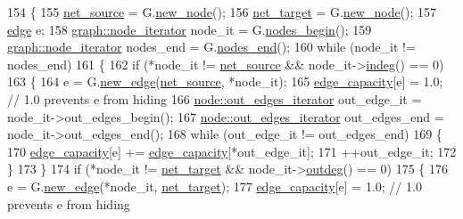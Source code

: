 \begin{DoxyCode}
154 \{
155     \mbox{\hyperlink{classmaxflow__pp_a20f2d05465acc2d7b777ea8025d12003}{net\_source}} = G.\mbox{\hyperlink{classgraph_ab9505335c20558319b6cce25aed23524}{new\_node}}();
156     \mbox{\hyperlink{classmaxflow__pp_a10f0b047011e04cb4816a824da5b7892}{net\_target}} = G.\mbox{\hyperlink{classgraph_ab9505335c20558319b6cce25aed23524}{new\_node}}();
157     \mbox{\hyperlink{classedge}{edge}} e;
158     \mbox{\hyperlink{classgraph_a2cb374b84c133ce13f94e73c3e5da7fa}{graph::node\_iterator}} node\_it = G.\mbox{\hyperlink{classgraph_aec053a4b509d1be804237a80044c54c0}{nodes\_begin}}();
159     \mbox{\hyperlink{classgraph_a2cb374b84c133ce13f94e73c3e5da7fa}{graph::node\_iterator}} nodes\_end = G.\mbox{\hyperlink{classgraph_abbf9c0cb5629e98e1142254911238173}{nodes\_end}}();
160     \textcolor{keywordflow}{while} (node\_it != nodes\_end)
161     \{
162     \textcolor{keywordflow}{if} (*node\_it != \mbox{\hyperlink{classmaxflow__pp_a20f2d05465acc2d7b777ea8025d12003}{net\_source}} && node\_it->\mbox{\hyperlink{classnode_a749bfd1316584b96f8c9b0e44ad512f0}{indeg}}() == 0)
163     \{
164         e = G.\mbox{\hyperlink{classgraph_a02a0c3a219f75d68caa408ef339d4a1c}{new\_edge}}(\mbox{\hyperlink{classmaxflow__pp_a20f2d05465acc2d7b777ea8025d12003}{net\_source}}, *node\_it);
165         \mbox{\hyperlink{classmaxflow__pp_af3cdc4999a86322271a80b1855d58629}{edge\_capacity}}[e] = 1.0;    \textcolor{comment}{// 1.0 prevents e from hiding}
166         \mbox{\hyperlink{classnode_a90e17ed34de55072e8077f4367499a98}{node::out\_edges\_iterator}} out\_edge\_it = node\_it->out\_edges\_begin();
167         \mbox{\hyperlink{classnode_a90e17ed34de55072e8077f4367499a98}{node::out\_edges\_iterator}} out\_edges\_end = node\_it->out\_edges\_end();
168         \textcolor{keywordflow}{while} (out\_edge\_it != out\_edges\_end)
169         \{
170         \mbox{\hyperlink{classmaxflow__pp_af3cdc4999a86322271a80b1855d58629}{edge\_capacity}}[e] += \mbox{\hyperlink{classmaxflow__pp_af3cdc4999a86322271a80b1855d58629}{edge\_capacity}}[*out\_edge\_it];
171         ++out\_edge\_it;
172         \}
173     \}
174     \textcolor{keywordflow}{if} (*node\_it != \mbox{\hyperlink{classmaxflow__pp_a10f0b047011e04cb4816a824da5b7892}{net\_target}} && node\_it->\mbox{\hyperlink{classnode_a32adc45c4132e2642ccd2233d79ffe67}{outdeg}}() == 0)
175     \{
176         e = G.\mbox{\hyperlink{classgraph_a02a0c3a219f75d68caa408ef339d4a1c}{new\_edge}}(*node\_it, \mbox{\hyperlink{classmaxflow__pp_a10f0b047011e04cb4816a824da5b7892}{net\_target}});
177         \mbox{\hyperlink{classmaxflow__pp_af3cdc4999a86322271a80b1855d58629}{edge\_capacity}}[e] = 1.0;    \textcolor{comment}{// 1.0 prevents e from hiding}

\end{DoxyCode}
